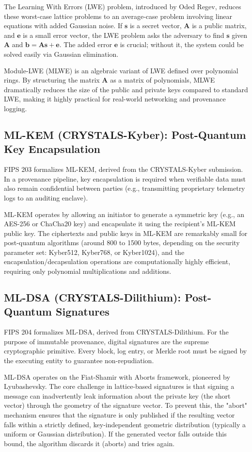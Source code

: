 The Learning With Errors (LWE) problem, introduced by Oded Regev, reduces these worst-case lattice problems to an average-case problem involving linear equations with added Gaussian noise. If $\mathbf{s}$ is a secret vector, $\mathbf{A}$ is a public matrix, and $\mathbf{e}$ is a small error vector, the LWE problem asks the adversary to find $\mathbf{s}$ given $\mathbf{A}$ and $\mathbf{b} = \mathbf{A}\mathbf{s} + \mathbf{e}$. The added error $\mathbf{e}$ is crucial; without it, the system could be solved easily via Gaussian elimination.

Module-LWE (MLWE) is an algebraic variant of LWE defined over polynomial rings. By structuring the matrix $\mathbf{A}$ as a matrix of polynomials, MLWE dramatically reduces the size of the public and private keys compared to standard LWE, making it highly practical for real-world networking and provenance logging.

\subsection{ML-KEM (CRYSTALS-Kyber): Post-Quantum Key Encapsulation}
FIPS 203 formalizes ML-KEM, derived from the CRYSTALS-Kyber submission. In a provenance pipeline, key encapsulation is required when verifiable data must also remain confidential between parties (e.g., transmitting proprietary telemetry logs to an auditing enclave). 

ML-KEM operates by allowing an initiator to generate a symmetric key (e.g., an AES-256 or ChaCha20 key) and encapsulate it using the recipient's ML-KEM public key. The ciphertexts and public keys in ML-KEM are remarkably small for post-quantum algorithms (around 800 to 1500 bytes, depending on the security parameter set: Kyber512, Kyber768, or Kyber1024), and the encapsulation/decapsulation operations are computationally highly efficient, requiring only polynomial multiplications and additions.

\subsection{ML-DSA (CRYSTALS-Dilithium): Post-Quantum Signatures}
FIPS 204 formalizes ML-DSA, derived from CRYSTALS-Dilithium. For the purpose of immutable provenance, digital signatures are the supreme cryptographic primitive. Every block, log entry, or Merkle root must be signed by the executing entity to guarantee non-repudiation.

ML-DSA operates on the Fiat-Shamir with Aborts framework, pioneered by Lyubashevsky. The core challenge in lattice-based signatures is that signing a message can inadvertently leak information about the private key (the short vector) through the geometry of the signature vector. To prevent this, the "abort" mechanism ensures that the signature is only published if the resulting vector falls within a strictly defined, key-independent geometric distribution (typically a uniform or Gaussian distribution). If the generated vector falls outside this bound, the algorithm discards it (aborts) and tries again.

